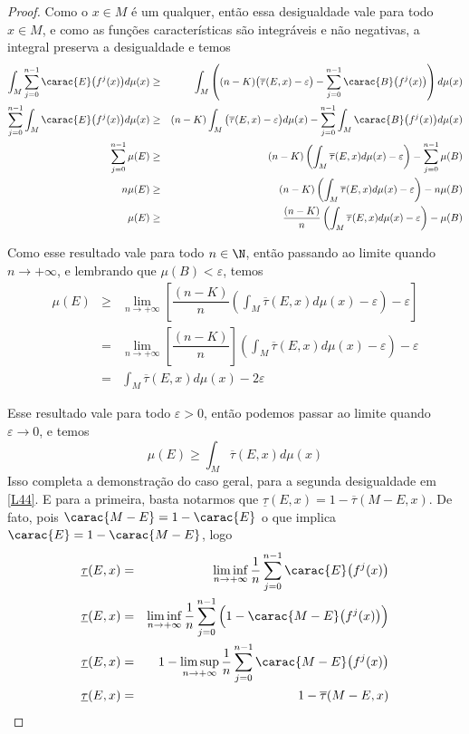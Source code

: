 \begin{proof}
Como o $x\in M$ é um qualquer, então essa desigualdade vale para todo $x\in M$, e como as funções características são integráveis e não negativas, a integral preserva a desigualdade e temos
\begin{eqnarray*}
\int_{M}\sum_{j=0}^{n-1}\carac{E}\big(f^j(x)\big)d\mu(x) & \geq & \int_{M}\left((n-K)\big(\overline{\tau}(E,x)-\varepsilon\big)-\sum_{j=0}^{n-1}\carac{B}\big(f^j(x)\big)\right)d\mu(x)\\
\sum_{j=0}^{n-1}\int_{M}\carac{E}\big(f^j(x)\big)d\mu(x) & \geq & (n-K)\int_{M}\big(\overline{\tau}(E,x)-\varepsilon\big)d\mu(x)-\sum_{j=0}^{n-1}\int_{M}\carac{B}\big(f^j(x)\big)d\mu(x)\\
\sum_{j=0}^{n-1}\mu(E) & \geq & (n-K)\left(\int_{M}\overline{\tau}(E,x)d\mu(x)-\varepsilon\right)-\sum_{j=0}^{n-1}\mu(B)\\
n\mu(E) & \geq & (n-K)\left(\int_{M}\overline{\tau}(E,x)d\mu(x)-\varepsilon\right)-n\mu(B)\\
\mu(E) & \geq & \dfrac{(n-K)}{n}\left(\int_{M}\overline{\tau}(E,x)d\mu(x)-\varepsilon\right)-\mu(B)
\end{eqnarray*}\vspace{0.1cm}

Como esse resultado vale para todo $n\in\N$, então passando ao limite quando $n\to+\infty$, e lembrando que $\mu(B)<\varepsilon$, temos
\begin{eqnarray*}
\mu(E) & \geq & \lim_{n\to+\infty}\left[\dfrac{(n-K)}{n}\left(\int_{M}\overline{\tau}(E,x)d\mu(x)-\varepsilon\right)-\varepsilon\right]\\
& = & \lim_{n\to+\infty}\left[\dfrac{(n-K)}{n}\right]\left(\int_{M}\overline{\tau}(E,x)d\mu(x)-\varepsilon\right)-\varepsilon\\
& = & \int_{M}\overline{\tau}(E,x)d\mu(x)-2\varepsilon
\end{eqnarray*}

Esse resultado vale para todo $\varepsilon>0$, então podemos passar ao limite quando $\varepsilon\to0$, e temos
\begin{equation}\label{primdesig}
\mu(E)\geq\int_{M}\overline{\tau}(E,x)d\mu(x)
\end{equation}
Isso completa a demonstração do caso geral, para a segunda desigualdade em \eqref{L44}. E para a primeira, basta notarmos que $\underline{\tau}(E,x)=1-\overline{\tau}(M-E,x)$. De fato, pois $\carac{M-E}=1-\carac{E}$ o que implica $\carac{E}=1-\carac{M-E}$, logo
\begin{eqnarray*}
\underline{\tau}(E,x) & = & \liminf_{n\to+\infty}\dfrac{1}{n}\sum_{j=0}^{n-1}\carac{E}\big(f^j(x)\big)\\
\underline{\tau}(E,x) & = & \liminf_{n\to+\infty}\dfrac{1}{n}\sum_{j=0}^{n-1}\Big(1-\carac{M-E}\big(f^j(x)\big)\Big)\\
\underline{\tau}(E,x) & = & 1-\limsup_{n\to+\infty}\dfrac{1}{n}\sum_{j=0}^{n-1}\carac{M-E}\big(f^j(x)\big)\\
\underline{\tau}(E,x) & = & 1-\overline{\tau}(M-E,x)
\end{eqnarray*}


\end{proof}
